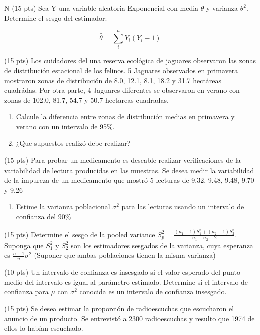 \documentclass[addpoints]{exam}
\theoremstyle{mytheor}
\begin{document}
  
  \begin{questions} 



  \question N (15 pts) Sea Y una variable aleatoria Exponencial con media $\theta$ y varianza $\theta^2$. Determine el sesgo del estimador:
  
  $$\hat{\theta} = \sum_{i}^{n} Y_i (Y_i-1)$$

  \question (15 pts) Los cuidadores del una reserva ecológica de jaguares observaron las zonas de distribución estacional de los felinos. 5 Jaguares observados en primavera mostraron zonas de distribución de 8.0, 12.1, 8.1, 18.2 y 31.7 hectáreas cuadrádas. Por otra parte, 4 Jaguares diferentes se observaron en verano con zonas de 102.0, 81.7, 54.7 y 50.7 hectareas cuadradas. 
  
  \begin{enumerate}
  \item Calcule la diferencia entre zonas de distribución medias en primavera y verano con un intervalo de 95\%. 
  \item ¿Que supuestos realizó debe realizar?
  \end{enumerate}
  
\question (15 pts) Para probar un medicamento es deseable realizar verificaciones de la variabilidad de lectura producidas en las muestras. Se desea medir la variabilidad de la impureza de un medicamento que mostró 5 lecturas de 9.32, 9.48, 9.48, 9.70 y 9.26
  
  \begin{enumerate}
  \item Estime la varianza poblacional $\sigma^2$ para las lecturas usando un intervalo de confianza del 90\%
  \end{enumerate}
  
    \question (15 pts) Determine el sesgo de la pooled variance $S_p^2 = \frac{(n_1-1) S_1^2 + (n_2-1) S_2^2}{n_1 + n_2 -2}$. Suponga que $S_1^2$ y $S_2^2$ son los estimadores sesgados de la varianza, cuya esperanza es $\frac{n-1}{n} \sigma^2$ (Suponer que ambas poblaciones tienen la misma varianza)

    \question (10 pts) Un intervalo de confianza es insesgado si el valor esperado del punto medio del intervalo es igual al parámetro estimado. Determine si el intervalo de confianza para $\mu$ con $\sigma^2$ conocida es un intervalo de confianza insesgado. 
  
  \question (15 pts) Se desea estimar la proporción de radioescuchas que escucharon el anuncio de un producto. Se entrevistó a 2300 radioescuchas y resulto que 1974 de ellos lo habían escuchado.
  

\end{questions}
\end{document}
